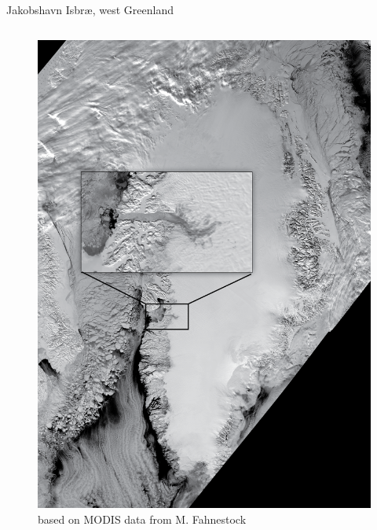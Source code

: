 \documentclass[hide notes,intlimits]{beamer}
\begin{document}
\begin{frame}[plain]
\end{frame}



{
%
} 


\begin{frame}{Jakobshavn Isbr{\ae}, west Greenland}
    \begin{columns}[c]
    \begin{column}{.50\linewidth}
      \begin{figure}
        \includegraphics[height=.8\textheight]{MODISGreenlandJakobshavn} \\
        \scriptsize{based on MODIS data from M. Fahnestock}
      \end{figure}
    \end{column}

\end{columns}
\end{frame}
\end{document}
